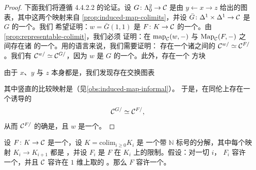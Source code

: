 \begin{proof}
下面我们将遵循 \cite{Lur09} 4.4.2.2 的论证。设 $G\colon \Lambda^2_0 \to \mathcal{C}$ 是由
$y \leftarrow x \to z$ 给出的图表，其中这两个映射来自
\cref{prop:induced-map-colimits}，并设
$\bar{G}\colon \Delta^1 \times \Delta^1 \to \mathcal{C}$ 是 $G$ 的一个\trColimit{}\trCone{}。我们
希望证明：$w = \bar{G}(1, 1)$ 是 $F\colon K \to \mathcal{C}$ 的一个\trColimit{}。由\cref{prop:representable-colimit}，我们必须
证明：在 $\mathrm{map}_{\mathcal{C}}(w, -)$ 与 $\mathrm{Map}_{\mathcal{C}}(F, -)$ 之间存在诸%
\trFunctor{}的一个\trEquivalence{}。用\trLeftFibration{}的语言来说，我们需要证明：
存在一个诸\trLeftFibration{}之间的\trEquivalence{} $\mathcal{C}^{w/} \simeq \mathcal{C}^{F/}$。我们有
$\mathcal{C}^{w/} \simeq \mathcal{C}^{G/}$，因为 $w$ 是 $G$ 的一个\trColimit{}。此外，存在一个%
\trHomotopyCartesian{}方块
\begin{center}
\end{center}
由于 $x$、$y$ 与 $z$ 本身都是\trColimit{}，我们发现存在交换图表
\begin{center}
\end{center}
其中竖直的比较映射是\trJoyalEquivalence{}（见\cref{obs:induced-map-informal}）。
于是，在同伦\trPullback{}上存在一个诱导的\trEquivalence{}%
\[
\mathcal{C}^{G/} \simeq \mathcal{C}^{F/},
\]
从而 $\mathcal{C}^{F/}$ 的确是\trRepresentable{}，且 $w$ 是一个\trRepresentingObject{}。
\end{proof}

\begin{proposition}\label{prop:sequential-colimit}
设 $F\colon K \to \mathcal{C}$ 是一个\trFunctor{}，设 $K = \mathrm{colim}_{i \ge 0} K_i$ 是
一个带 $\mathbb{N}$ 标号的分解，其中每个映射 $K_i \to K_{i+1}$ 都是%
\trMonomorphism{}，并设 $F_i$ 是 $F$ 在 $K_i$ 上的限制。假设：对一切 $i$，\trFunctor{}%
$F_i$ 容许一个\trColimit{}，并且 $\mathcal{C}$ 容许在 $1$ 维\trSimplicialSets{}上取的%
\trColimit{}。那么 $F$ 容许一个\trColimit{}。
\end{proposition}


